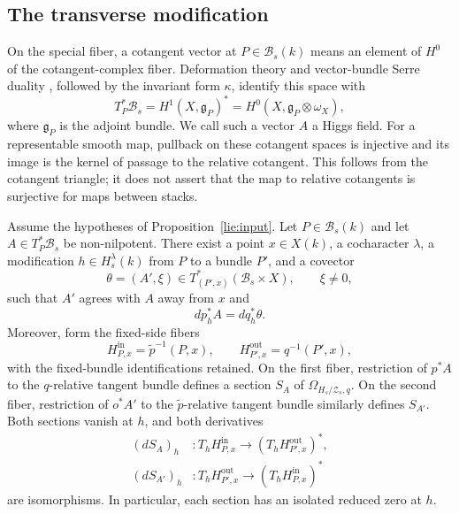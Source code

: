 \subsection{The transverse modification}

On the special fiber, a cotangent vector at $P\in\mathcal B_s(k)$ means
an element of $H^0$ of the cotangent-complex fiber. Deformation theory
and vector-bundle Serre duality \cite[Tag~0BS4]{Stacks}, followed by
the invariant form $\kappa$, identify this
space with
\[
 T_P^*\mathcal B_s
  =H^1(X,\mathfrak g_P)^*
  =H^0(X,\mathfrak g_P\otimes\omega_X),
\]
where $\mathfrak g_P$ is the adjoint bundle.  We call such a vector $A$
a Higgs field.  For a representable smooth map, pullback on these
cotangent spaces is injective and its image is the kernel of passage to
the relative cotangent.  This follows from the cotangent triangle; it
does not assert that the map to relative cotangents is surjective for
maps between stacks.

\begin{proposition}\label{hecke:transverse}
Assume the hypotheses of Proposition~\ref{lie:input}.  Let
$P\in\mathcal B_s(k)$ and let $A\in T_P^*\mathcal B_s$ be non-nilpotent.
There exist a point $x\in X(k)$, a cocharacter $\lambda$, a modification
$h\in H^\lambda_s(k)$ from $P$ to a bundle $P'$, and a covector
\[
 \theta=(A',\xi)\in T^*_{(P',x)}(\mathcal B_s\times X),
 \qquad \xi\ne0,
\]
such that $A'$ agrees with $A$ away from $x$ and
\begin{equation}\label{hecke:cotangent-identity}
 dp_h^*A=dq_h^*\theta.
\end{equation}
Moreover, form the fixed-side fibers
\[
 H^{\mathrm{in}}_{P,x}=\widetilde p^{-1}(P,x),
 \qquad H^{\mathrm{out}}_{P',x}=q^{-1}(P',x),
\]
with the fixed-bundle identifications retained.  On the first fiber,
restriction of $p^*A$ to the $q$-relative tangent bundle defines a section
$S_A$ of $\Omega_{H_s/\mathcal Z_s,q}$.  On the second fiber, restriction
of $o^*A'$ to the $\widetilde p$-relative tangent bundle similarly defines
$S_{A'}$.  Both sections vanish at $h$, and both derivatives
\begin{align*}
 (dS_A)_h &:T_hH^{\mathrm{in}}_{P,x}
                  \longrightarrow (T_hH^{\mathrm{out}}_{P',x})^*,\\
 (dS_{A'})_h &:T_hH^{\mathrm{out}}_{P',x}
                  \longrightarrow (T_hH^{\mathrm{in}}_{P,x})^*
\end{align*}
are isomorphisms.  In particular, each section has an isolated reduced
zero at $h$.
\end{proposition}

